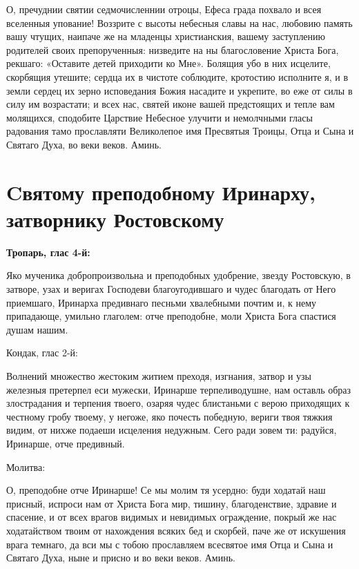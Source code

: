 О, пречуднии святии седмочисленнии отроцы, Ефеса града похвало и всея вселенныя упование! Воззрите с высоты небесныя славы на нас, любовию память вашу чтущих, наипаче же на младенцы христианския, вашему заступлению родителей своих препорученныя: низведите на ны благословение Христа Бога, рекшаго: «Оставите детей приходити ко Мне». Болящия убо в них исцелите, скорбящия утешите; сердца их в чистоте соблюдите, кротостию исполните я, и в земли сердец их зерно исповедания Божия насадите и укрепите, во еже от силы в силу им возрастати; и всех нас, святей иконе вашей предстоящих и тепле вам молящихся, сподобите Царствие Небесное улучити и немолчными гласы радования тамо прославляти Великолепое имя Пресвятыя Троицы, Отца и Сына и Святаго Духа, во веки веков. Аминь.


\section{Cвятому преподобному Иринарху, затворнику Ростовскому}
 


\bfseries Тропарь, глас 4-й:\normalfont{}\nopagebreak


Яко мученика добропроизвольна и преподобных удобрение, звезду Ростовскую, в затворе, узах и веригах Господеви благоугодившаго и чудес благодать от Него приемшаго, Иринарха предивнаго песньми хвалебными почтим и, к нему припадающе, умильно глаголем: отче преподобне, моли Христа Бога спастися душам нашим. 

\bfseries 

Кондак, глас 2-й:\normalfont{}


 Волнений множество жестоким житием преходя, изгнания, затвор и узы железныя претерпел еси мужески, Иринарше терпеливодушне, нам оставль образ злострадания и терпения твоего, озаряя чудес блистаньми с верою приходящих к честному гробу твоему, у негоже, яко почесть победную, вериги твоя тяжкия видим, от нихже подаеши исцеления недужным. Сего ради зовем ти: радуйся, Иринарше, отче предивный. 

\bfseries 

Молитва:\normalfont{}


О, преподобне отче Иринарше! Се мы молим тя усердно: буди ходатай наш присный, испроси нам от Христа Бога мир, тишину, благоденствие, здравие и спасение, и от всех врагов видимых и невидимых ограждение, покрый же нас ходатайством твоим от нахождения всяких бед и скорбей, паче же от искушения врага темнаго, да вси мы с тобою прославляем всесвятое имя Отца и Сына и Святаго Духа, ныне и присно и во веки веков. Аминь. 
\mychapterending

